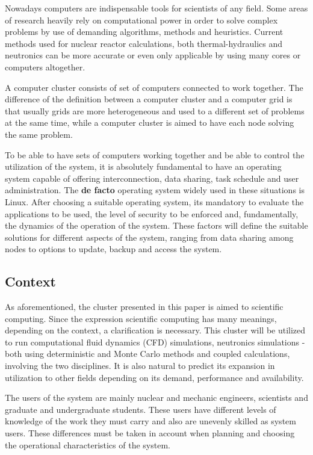 \documentclass[twoside,a4paper,12pt,english]{inac17}
\begin{document}
Nowadays computers are indispensable tools for scientists of any field.
Some areas of research heavily rely on computational power in order to solve
complex problems by use of demanding algorithms, methods and heuristics.
Current methods used for nuclear reactor calculations, both thermal-hydraulics
and neutronics can be more accurate or even only applicable by using
many cores or computers altogether.

A computer cluster consists of set of computers connected to work together. The difference of the
definition between a computer cluster and a computer grid is that usually grids are more
heterogeneous and used to a different set of problems at the same time, while a computer
cluster is aimed to have each node solving the same problem.

To be able to have sets of computers working together and be able to control the utilization of the system,
it is absolutely fundamental to have an operating system capable of offering interconnection, data sharing,
task schedule and user administration. The \textbf{de facto} operating system widely used in these situations
is Linux\cite{linux}. After choosing a suitable operating system, its mandatory to evaluate the applications to
be used, the level of security to be enforced and, fundamentally, the dynamics of the operation of the system.
These factors will define the suitable solutions for different aspects of the system, ranging from data
sharing among nodes to options to update, backup and access the system.


\subsection{Context}

As aforementioned, the cluster presented in this paper is aimed to scientific computing.
Since the expression scientific computing has many meanings, depending on the context, a
clarification is necessary. This cluster will be utilized to run computational fluid dynamics
(CFD) simulations, neutronics simulations - both using deterministic and Monte Carlo methods
and coupled calculations, involving the two disciplines. It is also natural to predict
its expansion in utilization to other fields depending on its demand, performance and availability.

The users of the system are mainly nuclear and mechanic engineers, scientists and graduate
and undergraduate students. These users have different levels of knowledge of the work
they must carry and also are unevenly skilled as system users. These differences must be taken
in account when planning and choosing the operational characteristics of the system.
\end{document}
